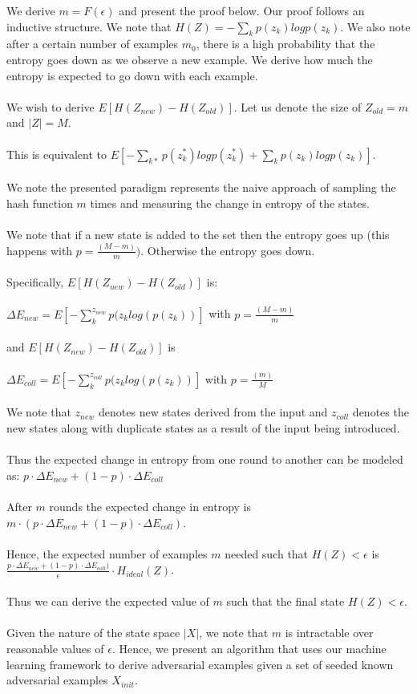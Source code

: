 \documentclass[letterpaper,twocolumn,10pt]{article}
\begin{document}
We derive $m = F(\epsilon)$ and present the proof below. Our proof follows an inductive structure. We note that $H(Z) = -\sum_{k} p(z_{k}) log p(z_{k})$. We also note after a certain number of examples $m_{0}$, there is a high probability that the entropy goes down as we observe a new example. We derive how much the entropy is expected to go down with each example. 
\\
\\
We wish to derive $E[H(Z_{new}) - H(Z_{old})]$. Let us denote the size of $Z_{old} = m$ and $|Z| = M$.  
\\
\\
This is equivalent to $E[-\sum_{k*} p(z_{k}^{*})log p(z_{k}^{*}) + \sum_{k} p(z_{k}) log p(z_{k})]$. 
\\
\\
We note the presented paradigm represents the naive approach of sampling the hash function $m$ times and measuring the change in entropy of the states. 
\\
\\
We note that if a new state is added to the set then the entropy goes up (this happens with $p = \frac{(M-m)}{m})$. Otherwise the entropy goes down.
\\
\\
Specifically, $E[H(Z_{new}) - H(Z_{old})]$ is:
\\
\\
$\Delta E_{new} = E[-\sum_{k}^{z_{new}} p(z_{k} log(p(z_{k}))]$ with $p = \frac{(M-m)}{m}$
\\
\\
and $E[H(Z_{new}) - H(Z_{old})]$ is
\\
\\
$\Delta E_{coll} = E[-\sum_{k}^{z_{coll}} p(z_{k} log(p(z_{k}))]$ with $p = \frac{(m)}{M}$
\\
\\
We note that $z_{new}$ denotes new states derived from the input and $z_{coll}$ denotes the new states along with duplicate states as a result of the input being introduced. 
\\
\\
Thus the expected change in entropy from one round to another can be modeled as: $p \cdot \Delta E_{new} + (1-p) \cdot  \Delta E_{coll}$
\\
\\
After $m$ rounds the expected change in entropy is $m \cdot (p \cdot \Delta E_{new} + (1-p) \cdot  \Delta E_{coll})$. 
\\
\\
Hence, the expected number of examples $m$ needed such that $H(Z) < \epsilon$ is $\frac{p \cdot \Delta E_{new} + (1-p) \cdot  \Delta E_{coll})}{\epsilon} \cdot H_{ideal}(Z)$. 
\\
\\
Thus we can derive the expected value of $m$ such that the final state $H(Z) < \epsilon$. 
\\
\\
Given the nature of the state space $|X|$, we note that $m$ is intractable over reasonable values of $\epsilon$. Hence, we present an algorithm that uses our machine learning framework to derive adversarial examples given a set of seeded known adversarial examples $X_{init}$. 
\end{document}
